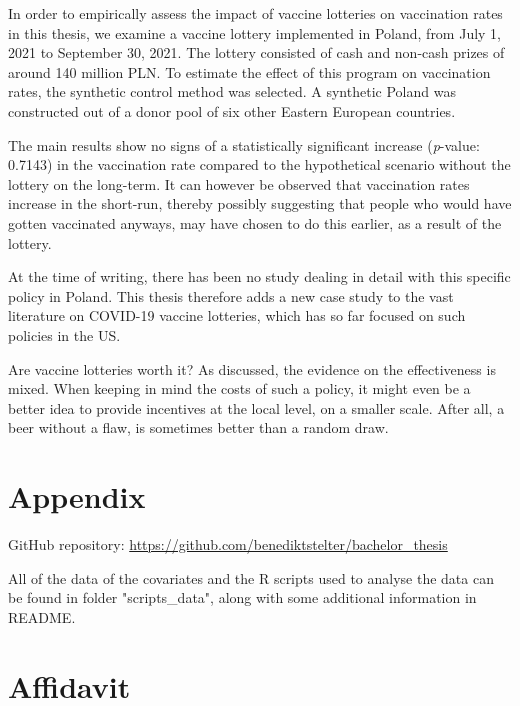 \documentclass{scrbook}
\begin{document}
In order to empirically assess the impact of vaccine lotteries on
vaccination rates in this thesis, we examine a vaccine lottery
implemented in Poland, from July 1, 2021 to September 30, 2021. The
lottery consisted of cash and non-cash prizes of around 140 million PLN.
To estimate the effect of this program on vaccination rates, the
synthetic control method was selected. A synthetic Poland was
constructed out of a donor pool of six other Eastern European countries.

The main results show no signs of a statistically significant increase
(\textit{p}-value: 0.7143) in the vaccination rate compared to the
hypothetical scenario without the lottery on the long-term. It can
however be observed that vaccination rates increase in the short-run,
thereby possibly suggesting that people who would have gotten vaccinated
anyways, may have chosen to do this earlier, as a result of the lottery.

At the time of writing, there has been no study dealing in detail with
this specific policy in Poland. This thesis therefore adds a new case
study to the vast literature on COVID-19 vaccine lotteries, which has so
far focused on such policies in the US.

Are vaccine lotteries worth it? As discussed, the evidence on the
effectiveness is mixed. When keeping in mind the costs of such a policy,
it might even be a better idea to provide incentives at the local level,
on a smaller scale. After all, a beer without a flaw, is sometimes
better than a random draw.


 
\backmatter


 
\renewcommand\refname{References}
\printbibliography[title=References]

\chapter{Appendix}
GitHub repository: \url{https://github.com/benediktstelter/bachelor_thesis}

\noindent All of the data of the covariates and the R scripts used to analyse the data can be found in folder "scripts\_data", along with some additional information in README.



\chapter{Affidavit}
\thispagestyle{empty}
\end{document}
